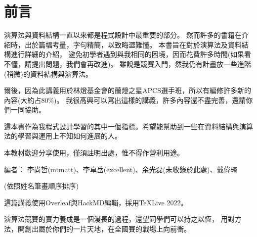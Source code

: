 \chapter*{前言}

演算法與資料結構一直以來都是程式設計中最重要的部分。
然而許多的書籍在介紹時，出於篇幅考量，字句精簡，以致晦澀難懂。
本書旨在對於演算法及資料結構進行詳細的介紹，
避免初學者遇到與我相同的困境，因而花費許多時間(如果看不懂，請提出問題，我們會再改進)。
雖說是競賽入門，然我仍有計畫放一些進階(稍微)的資料結構與演算法。

爾後，因為此講義用於林燈基金會的蘭燈之星APCS選手班，所以有編修許多新的內容(大約占80\%)。
我很高興可以寫出這樣的講義，許多內容還不盡完善，還請你們一同協助。

這本書作為我程式設計學習的其中一個指標。希望能幫助到一些在資料結構與演算法的學習與運用上不知如何進展的人。

本教材歡迎分享使用，僅須註明出處，惟不得作營利用途。

編者：
李尚哲(mtmatt)、李卓岳(excellent)、余光磊(未收錄於此處)、戴偉璿

(依照姓名筆畫順序排序)

這篇講義使用Overleaf與HackMD編輯，採用\TeX Live 2022。

演算法競賽的實力養成是一個漫長的過程，還望同學們可以持之以恆，
用對方法，開創出屬於你們的一片天地，在全國賽的戰場上向前衝。